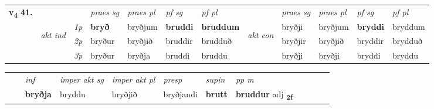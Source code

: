 \begin{tabular}{llllllllllll} \toprule
\multirow{4}{*}{{{\textbf{v{\textsubscript{4}}} \Large{\textbf{41.}}}}}  & &   &  \textit{praes sg}  & \textit{praes pl}  &\textit{ pf sg} & \textit{pf pl} &  &  \textit{praes sg}  & \textit{praes pl}  & \textit{pf sg} & \textit{pf pl } \\*
	\cmidrule{4-7} \cmidrule{9-12}
 & \multirow{3}{*}{\begin{turn}{90}\textit{akt ind}\end{turn}} & {\textit{1p}} & \textbf{bryð} & bryðjum    & \textbf{bruddi} & \textbf{bruddum} & \multirow{3}{*}{\begin{turn}{90}\textit{akt con}\end{turn}} &bryðji & bryðjum & \textbf{bryddi} & bryddum\\*
& &  {\textit{2p}} &  bryður  & bryðjið   & bruddir & brudduð & & bryðjir & bryðjið & bryddir & brydduð \\*
& &  {\textit{3p}} & bryður & bryðja   & bruddi & bruddu & & bryðji & bryðji& bryddi & bryddu  \\*
\cmidrule{4-7} \cmidrule{9-12}
\end{tabular}


\begin{tabular}{llllllllllll}
 & & \textit{inf} & \textit{imper akt sg} & \textit{imper akt pl}   & \textit{presp} & \textit{supin}  & \textit{pp m}     \\*
  & & \textbf{bryðja} & bryddu  & bryðjið   & bryðjandi &  \textbf{brutt}  & \textbf{bruddur} adj \textbf{\textsubscript{2f}} \\*
\cmidrule{1-12}
\end{tabular}



